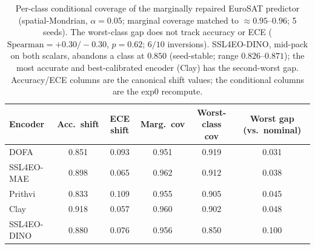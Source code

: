 \documentclass[11pt]{article}
\begin{document}
\begin{table}[t]\centering\small
\caption{Per-class conditional coverage of the marginally repaired EuroSAT predictor
(spatial-Mondrian, $\alpha{=}0.05$; marginal coverage matched to $\approx0.95$--$0.96$; 5 seeds). The
worst-class gap does not track accuracy or ECE ($\mathrm{Spearman}=+0.30/-0.30$, $p{=}0.62$; $6/10$
inversions). SSL4EO-DINO, mid-pack on both scalars, abandons a class at $0.850$ (seed-stable; range $0.826$--$0.871$); the most accurate and
best-calibrated encoder (Clay) has the second-worst gap. Accuracy/ECE columns are the canonical shift
values; the conditional columns are the exp0 recompute.}\label{tab:condcov}
\begin{tabular}{lccccc}
\toprule
Encoder & Acc.\ shift & ECE shift & Marg.\ cov & Worst-class cov & Worst gap (vs.\ nominal) \\
\midrule
DOFA        & 0.851 & 0.093 & 0.951 & 0.919 & 0.031 \\
SSL4EO-MAE  & 0.898 & 0.065 & 0.962 & 0.912 & 0.038 \\
Prithvi     & 0.833 & 0.109 & 0.955 & 0.905 & 0.045 \\
Clay        & 0.918 & 0.057 & 0.960 & 0.902 & 0.048 \\
SSL4EO-DINO & 0.880 & 0.076 & 0.956 & 0.850 & 0.100 \\
\bottomrule
\end{tabular}
\end{table}
\end{document}
